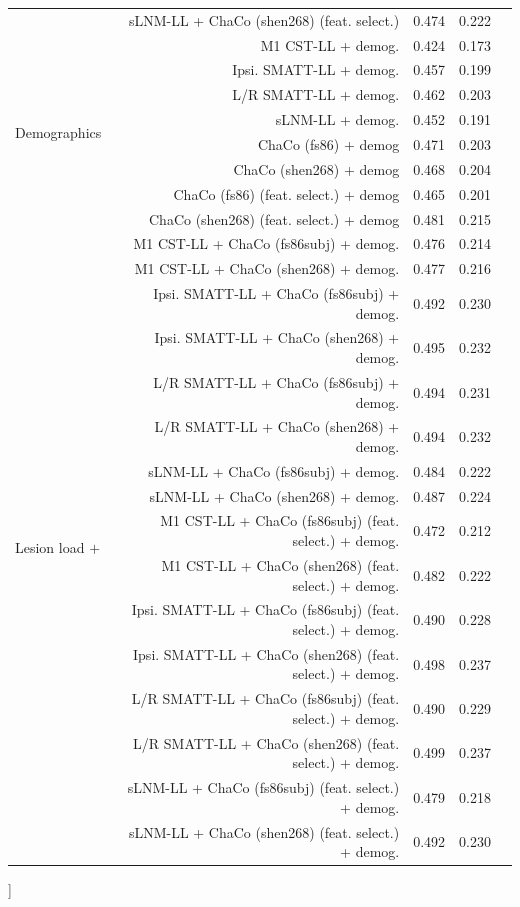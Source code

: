 \documentclass[phd,tocprelim]{cornell}
\def\Plus{\texttt{+}}
\renewcommand{\caption}[1]{\singlespacing\hangcaption{#1}\normalspacing}
\begin{document}
\begin{table}[h]
\begin{scriptsize}
\begin{tabular}{lrrll}
 & sLNM-LL + ChaCo (shen268) (feat. select.) & 0.474 & 0.222 \\
\multirow[t]{8}{*}{Demographics} & M1 CST-LL + demog. & 0.424 & 0.173 \\
 & Ipsi. SMATT-LL + demog. & 0.457 & 0.199 \\
 & L/R SMATT-LL + demog. & 0.462 & 0.203 \\
 & sLNM-LL + demog. & 0.452 & 0.191 \\
 & ChaCo (fs86) + demog & 0.471 & 0.203 \\
 & ChaCo (shen268) + demog & 0.468 & 0.204 \\
 & ChaCo (fs86) (feat. select.) + demog & 0.465 & 0.201 \\
 & ChaCo (shen268) (feat. select.) + demog & 0.481 & 0.215 \\
\multirow[t]{16}{*}{Lesion load $\Plus$} & M1 CST-LL + ChaCo (fs86subj) + demog. & 0.476 & 0.214 \\
 ChaCo $\Plus$ & M1 CST-LL + ChaCo (shen268) + demog. & 0.477 & 0.216 \\
 Demographics & Ipsi. SMATT-LL + ChaCo (fs86subj) + demog. & 0.492 & 0.230 \\
 & Ipsi. SMATT-LL + ChaCo (shen268) + demog. & 0.495 & 0.232 \\
 & L/R SMATT-LL + ChaCo (fs86subj) + demog. & 0.494 & 0.231 \\
 & L/R SMATT-LL + ChaCo (shen268) + demog. & 0.494 & 0.232 \\
 & sLNM-LL + ChaCo (fs86subj) + demog. & 0.484 & 0.222 \\
 & sLNM-LL + ChaCo (shen268) + demog. & 0.487 & 0.224 \\
 & M1 CST-LL + ChaCo (fs86subj) (feat. select.) + demog. & 0.472 & 0.212 \\
 & M1 CST-LL + ChaCo (shen268) (feat. select.) + demog. & 0.482 & 0.222 \\
 & Ipsi. SMATT-LL + ChaCo (fs86subj) (feat. select.) + demog. & 0.490 & 0.228 \\
 & Ipsi. SMATT-LL + ChaCo (shen268) (feat. select.) + demog. & 0.498 & 0.237 \\
 & L/R SMATT-LL + ChaCo (fs86subj) (feat. select.) + demog. & 0.490 & 0.229 \\
 & L/R SMATT-LL + ChaCo (shen268) (feat. select.) + demog. & 0.499 & 0.237 \\
 & sLNM-LL + ChaCo (fs86subj) (feat. select.) + demog. & 0.479 & 0.218 \\
 & sLNM-LL + ChaCo (shen268) (feat. select.) + demog. & 0.492 & 0.230 \\

\bottomrule
\end{tabular}
\end{scriptsize}
		\ContinuedFloat
		\captionsetup{labelformat=adja-page}
		    \caption[]{}

\end{table}
\end{document}
